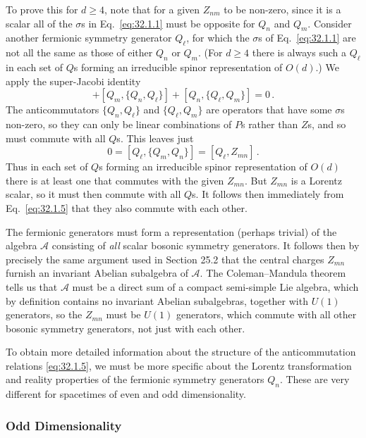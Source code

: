 To prove this for \(d\geq4\), note that for a given \(Z_{nm}\) to be
non-zero, since it is a scalar all of the \(\sigma\)s in
Eq.~\eqref{eq:32.1.1} must be opposite for \(Q_n\) and \(Q_m\). Consider
another fermionic symmetry generator \(Q_\ell\), for which the \(\sigma\)s
of Eq.~\eqref{eq:32.1.1} are not all the same as those of either \(Q_n\)
or \(Q_m\). (For \(d\geq4\) there is always such a \(Q_\ell\) in each set
of \(Q\)s forming an irreducible spinor representation of \(O(d)\).) We
apply the super-Jacobi identity
\begin{equation}
  [Q_\ell,\{Q_m,Q_n\}]
  +[Q_m,\{Q_n,Q_\ell\}]
  +[Q_n,\{Q_\ell,Q_m\}]=0\,.
  \tag{32.1.6}\label{eq:32.1.6}
\end{equation}
The anticommutators \(\{Q_n,Q_\ell\}\) and \(\{Q_\ell,Q_m\}\) are
operators that have some \(\sigma\)s non-zero, so they can only be linear
combinations of \(P\)s rather than \(Z\)s, and so must commute with all
\(Q\)s. This leaves just
\begin{equation}
  0=[Q_\ell,\{Q_m,Q_n\}]=[Q_\ell,Z_{mn}]\,.
  \tag{32.1.7}\label{eq:32.1.7}
\end{equation}
Thus in each set of \(Q\)s forming an irreducible spinor representation of
\(O(d)\) there is at least one that commutes with the given \(Z_{mn}\).
But \(Z_{mn}\) is a Lorentz scalar, so it must then commute with all \(Q\)s.
It follows then immediately from Eq.~\eqref{eq:32.1.5} that they also
commute with each other.

The fermionic generators must form a representation (perhaps trivial) of
the algebra \(\mathcal A\) consisting of \textit{all} scalar bosonic
symmetry generators. It follows then by precisely the same argument used in
Section 25.2 that the central charges \(Z_{mn}\) furnish an invariant
Abelian subalgebra of \(\mathcal A\). The Coleman--Mandula theorem tells us
that \(\mathcal A\) must be a direct sum of a compact semi-simple Lie
algebra, which by definition contains no invariant Abelian subalgebras,
together with \(U(1)\) generators, so the \(Z_{mn}\) must be \(U(1)\)
generators, which commute with all other bosonic symmetry generators, not
just with each other.

To obtain more detailed information about the structure of the
anticommutation relations \eqref{eq:32.1.5}, we must be more specific about
the Lorentz transformation and reality properties of the fermionic symmetry
generators \(Q_n\). These are very different for spacetimes of even and odd
dimensionality.

\subsubsection*{Odd Dimensionality}

